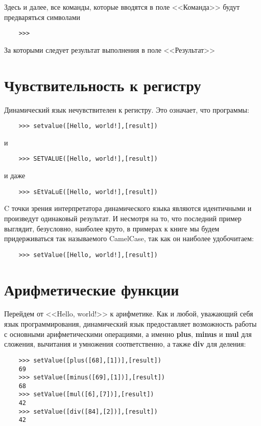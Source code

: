 \documentclass[../index.tex]{subfiles}
\begin{document}
    Здесь и далее, все команды, которые вводятся в поле <<Команда>> будут предваряться символами     \begin{verbatim}
    >>>
    \end{verbatim}    За которыми следует результат выполнения в поле <<Результат>>
    
    \section{Чувствительность к регистру}
    
    Динамический язык нечувствителен к регистру. Это означает, что программы:
    
    \begin{verbatim}
    >>> setvalue([Hello, world!],[result])
    \end{verbatim}
    
    и
    
    \begin{verbatim}
    >>> SETVALUE([Hello, world!],[result])
    \end{verbatim}
    
    и даже
    
    \begin{verbatim}
    >>> sEtVaLuE([Hello, world!],[result])
    \end{verbatim}
    
    C точки зрения интерпретатора динамического языка являются идентичными и произведут одинаковый результат. И несмотря на то, что последний пример выглядит, безусловно, наиболее круто, в примерах к книге мы будем придерживаться так называемого CamelCase, так как он наиболее удобочитаем:
    
    \begin{verbatim}
    >>> setValue([Hello, world!],[result])
    \end{verbatim}
    
    \section{Арифметические функции}
    
    Перейдем от <<Hello, world!>> к арифметике. Как и любой, уважающий себя язык программирования, динамический язык предоставляет возможность работы с основными арифметическими операциями, а именно {\bf plus}, {\bf minus} и {\bf mul} для сложения, вычитания и умножения соответственно, а также {\bf div} для деления:
    
    \begin{verbatim}
    >>> setValue([plus([68],[1])],[result])
    69
    >>> setValue([minus([69],[1])],[result])
    68
    >>> setValue([mul([6],[7])],[result])
    42
    >>> setValue([div([84],[2])],[result])
    42
    \end{verbatim}
    
\end{document}
